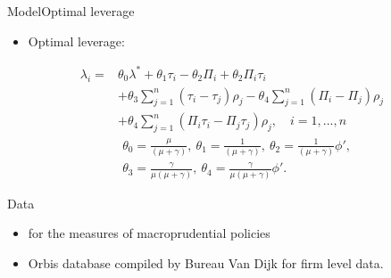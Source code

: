 \documentclass{beamer}
\begin{document}
\begin{frame}{Model}{Optimal leverage}
\begin{itemize}
	\item  Optimal leverage:
\end{itemize}
\begin{equation}
\begin{aligned}
\lambda_i = &\theta_0\lambda^*+\theta_1\tau_i-\theta_2\Pi_i+\theta_2\Pi_i\tau_{i}\\
&+\theta_3\sum_{j=1}^{n}(\tau_i-\tau_j)\rho_j-\theta_4\sum_{j=1}^{n}(\Pi_i-\Pi_j)\rho_j\\
&+\theta_4\sum_{j=1}^{n}(\Pi_i\tau_i-\Pi_j\tau_j)\rho_j, \quad i=1,...,n
\end{aligned}
\label{eq:optimal leverage in theory}
\end{equation}
\begin{equation*}
\begin{aligned}
&\theta_0=\frac{\mu}{(\mu+\gamma)}, \ \theta_1=\frac{1}{(\mu+\gamma)}, \
\theta_2=\frac{1}{(\mu+\gamma)}\phi', \\
&\theta_3=\frac{\gamma}{\mu(\mu+\gamma)}, \
\theta_4=\frac{\gamma}{\mu(\mu+\gamma)}\phi'.
\end{aligned}
\end{equation*}
\end{frame}

\begin{frame}{Data}
\begin{itemize}
	\item \cite{cerutti2017changes} for the measures of macroprudential policies 
	\item Orbis database compiled by Bureau Van Dijk for firm level data.
\end{itemize}
\begin{center}
		\begin{tiny}		
	\end{tiny}
\end{center}
\end{frame}
\end{document}
